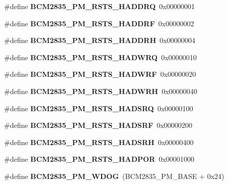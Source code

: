 \begin{DoxyCompactItemize}
\item 
\mbox{\label{group__raspberrypi__reg_ga3cc3b72153af07c32e2814636325e36d}} 
\#define {\bfseries B\+C\+M2835\+\_\+\+P\+M\+\_\+\+R\+S\+T\+S\+\_\+\+H\+A\+D\+D\+RQ}~0x00000001
\item 
\mbox{\label{group__raspberrypi__reg_ga77d075af3d4cd11980dfe5b30cf3ff4f}} 
\#define {\bfseries B\+C\+M2835\+\_\+\+P\+M\+\_\+\+R\+S\+T\+S\+\_\+\+H\+A\+D\+D\+RF}~0x00000002
\item 
\mbox{\label{group__raspberrypi__reg_gab2a1fa9d629e0ede85ae75dfe23aeeae}} 
\#define {\bfseries B\+C\+M2835\+\_\+\+P\+M\+\_\+\+R\+S\+T\+S\+\_\+\+H\+A\+D\+D\+RH}~0x00000004
\item 
\mbox{\label{group__raspberrypi__reg_gab47957acb5d9a33f7081f54892f4f7be}} 
\#define {\bfseries B\+C\+M2835\+\_\+\+P\+M\+\_\+\+R\+S\+T\+S\+\_\+\+H\+A\+D\+W\+RQ}~0x00000010
\item 
\mbox{\label{group__raspberrypi__reg_ga1fca25c9a4a1ddbbd71dafb114a1ac23}} 
\#define {\bfseries B\+C\+M2835\+\_\+\+P\+M\+\_\+\+R\+S\+T\+S\+\_\+\+H\+A\+D\+W\+RF}~0x00000020
\item 
\mbox{\label{group__raspberrypi__reg_ga5a43de1ea27356ef5fb4a9a40c498bbb}} 
\#define {\bfseries B\+C\+M2835\+\_\+\+P\+M\+\_\+\+R\+S\+T\+S\+\_\+\+H\+A\+D\+W\+RH}~0x00000040
\item 
\mbox{\label{group__raspberrypi__reg_ga81377dca99f99a54a31f11466b09d9a6}} 
\#define {\bfseries B\+C\+M2835\+\_\+\+P\+M\+\_\+\+R\+S\+T\+S\+\_\+\+H\+A\+D\+S\+RQ}~0x00000100
\item 
\mbox{\label{group__raspberrypi__reg_ga106280a5865c04b4494aea4e9d100d35}} 
\#define {\bfseries B\+C\+M2835\+\_\+\+P\+M\+\_\+\+R\+S\+T\+S\+\_\+\+H\+A\+D\+S\+RF}~0x00000200
\item 
\mbox{\label{group__raspberrypi__reg_gac4185dbefe1d0c251ee9c9e6bb3036cf}} 
\#define {\bfseries B\+C\+M2835\+\_\+\+P\+M\+\_\+\+R\+S\+T\+S\+\_\+\+H\+A\+D\+S\+RH}~0x00000400
\item 
\mbox{\label{group__raspberrypi__reg_ga4a50219ce9c848bfa02b4cf87ee3d471}} 
\#define {\bfseries B\+C\+M2835\+\_\+\+P\+M\+\_\+\+R\+S\+T\+S\+\_\+\+H\+A\+D\+P\+OR}~0x00001000
\item 
\mbox{\label{group__raspberrypi__reg_ga36f2bc4c7ed2a1ca5a69c176d03fbc4a}} 
\#define {\bfseries B\+C\+M2835\+\_\+\+P\+M\+\_\+\+W\+D\+OG}~(B\+C\+M2835\+\_\+\+P\+M\+\_\+\+B\+A\+SE + 0x24)
\end{DoxyCompactItemize}
